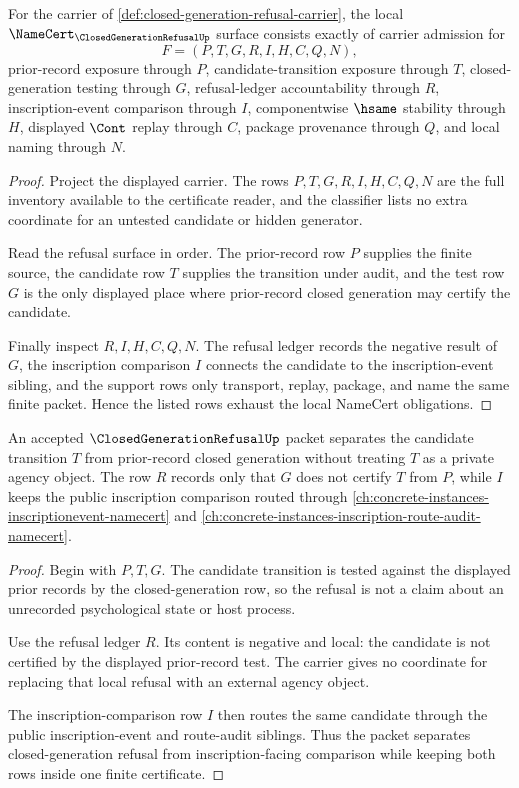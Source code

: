 \begin{theorem}
\label{thm:closed-generation-refusal-namecert-obligations}
For the carrier of \autoref{def:closed-generation-refusal-carrier}, the local
$\NameCert_{\ClosedGenerationRefusalUp}$ surface consists exactly of carrier
admission for
$$
F=(P,T,G,R,I,H,C,Q,N),
$$
prior-record exposure through $P$, candidate-transition exposure through $T$,
closed-generation testing through $G$, refusal-ledger accountability through
$R$, inscription-event comparison through $I$, componentwise $\hsame$
stability through $H$, displayed $\Cont$ replay through $C$, package
provenance through $Q$, and local naming through $N$.
\end{theorem}
\begin{proof}
Project the displayed carrier. The rows $P,T,G,R,I,H,C,Q,N$ are the full
inventory available to the certificate reader, and the classifier lists no
extra coordinate for an untested candidate or hidden generator.

Read the refusal surface in order. The prior-record row $P$ supplies the
finite source, the candidate row $T$ supplies the transition under audit, and
the test row $G$ is the only displayed place where prior-record closed
generation may certify the candidate.

Finally inspect $R,I,H,C,Q,N$. The refusal ledger records the negative result
of $G$, the inscription comparison $I$ connects the candidate to the
inscription-event sibling, and the support rows only transport, replay,
package, and name the same finite packet. Hence the listed rows exhaust the
local NameCert obligations.
\end{proof}

\begin{theorem}
\label{thm:closed-generation-refusal-inscription-separation}
An accepted $\ClosedGenerationRefusalUp$ packet separates the candidate
transition $T$ from prior-record closed generation without treating $T$ as a
private agency object. The row $R$ records only that $G$ does not certify $T$
from $P$, while $I$ keeps the public inscription comparison routed through
\autoref{ch:concrete-instances-inscriptionevent-namecert} and
\autoref{ch:concrete-instances-inscription-route-audit-namecert}.
\end{theorem}
\begin{proof}
Begin with $P,T,G$. The candidate transition is tested against the displayed
prior records by the closed-generation row, so the refusal is not a claim
about an unrecorded psychological state or host process.

Use the refusal ledger $R$. Its content is negative and local: the candidate
is not certified by the displayed prior-record test. The carrier gives no
coordinate for replacing that local refusal with an external agency object.

The inscription-comparison row $I$ then routes the same candidate through the
public inscription-event and route-audit siblings. Thus the packet separates
closed-generation refusal from inscription-facing comparison while keeping
both rows inside one finite certificate.
\end{proof}

